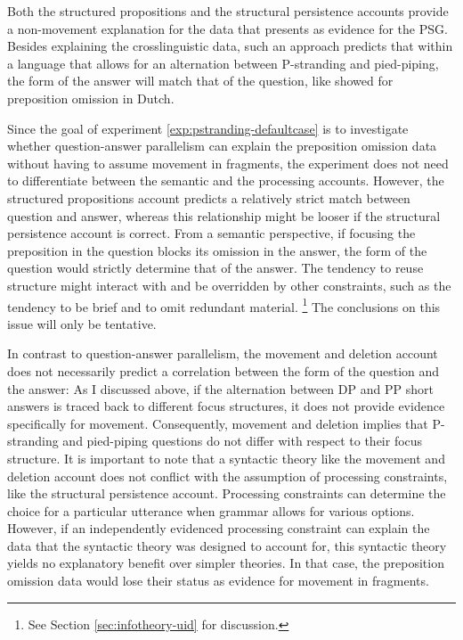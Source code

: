 Both the structured pro\-positions and the structural persistence accounts provide a non-movement explanation for the data that \citet{merchant2001, merchant2004} presents as evidence for the PSG. Besides explaining the crosslinguistic data, such an approach predicts that within a language that allows for an alternation between P-stranding and pied-piping, the form of the answer will match that of the question, like \citet{levelt.kelter1982} showed for preposition omission in Dutch.

Since the goal of experiment \ref{exp:pstranding-defaultcase} is to investigate whether question-answer parallelism can explain the preposition omission data without having to assume movement in fragments, the experiment does not need to differentiate between the semantic and the processing accounts. However, the structured propositions account predicts a relatively strict match between question and answer, whereas this relationship might be looser if the structural persistence account is correct. From a semantic perspective, if focusing the preposition in the question blocks its omission in the answer, the form of the question would strictly determine that of the answer. The tendency to reuse structure might interact with and be overridden by other constraints, such as the tendency to be brief and to omit redundant material.%
%
\footnote{See Section \ref{sec:infotheory-uid} for discussion.}\afterfn%
%
The conclusions on this issue will only be tentative.

In contrast to question-answer parallelism, the movement and deletion account does not necessarily predict a correlation between the form of the question and the answer: As I discussed above, if the alternation between DP and PP short answers is traced back to different focus structures, it does not provide evidence specifically for movement. Consequently, movement and deletion implies that P-stranding and pied-piping questions do not differ with respect to their focus structure. It is important to note that a syntactic theory like the movement and deletion account does not conflict with the assumption of processing constraints, like the structural persistence account. Processing constraints can determine the choice for a particular utterance when grammar allows for various options. However, if an independently evidenced processing constraint can explain the data that the syntactic theory was designed to account for, this syntactic theory yields no explanatory benefit over simpler theories. In that case, the preposition omission data would lose their status as evidence for movement in fragments.

